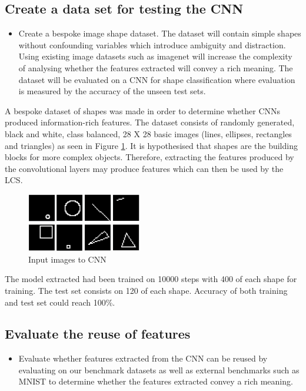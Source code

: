 \subsection{Create a data set for testing the CNN}
\begin{itemize}
	\item Create a bespoke image shape dataset. The dataset will contain simple shapes without confounding variables which introduce ambiguity and distraction. Using existing image datasets such as imagenet \cite{imagenet} will increase the complexity of analysing whether the features extracted will convey a rich meaning. The dataset will be evaluated on a CNN for shape classification where evaluation is measured by the accuracy of the unseen test sets.
	
\end{itemize}
A bespoke dataset of shapes was made in order to determine whether CNNs produced information-rich features. The dataset consists of randomly generated, black and white, class balanced, 28 X 28 basic images (lines, ellipses, rectangles and triangles) as seen in Figure \ref{fig:inputShapes}. It is hypothesised that shapes are the building blocks for more complex objects. Therefore, extracting the features produced by the convolutional layers may produce features which can then be used by the LCS. 
\begin{figure}[H]
	\begin{center}
		\includegraphics[width=50mm, scale=0.9]{inputShapes.png}
		\caption{Input images to CNN}
		\label{fig:inputShapes}
	\end{center}
	
\end{figure}
The model extracted had been trained on 10000 steps with 400 of each shape for training. The test set consists on 120 of each shape. Accuracy of both training and test set could reach 100\%. 

\subsection{Evaluate the reuse of features} \label{subsec:reuse}
\begin{itemize}
		\item Evaluate whether features extracted from the CNN can be reused by evaluating on our benchmark datasets as well as external benchmarks such as MNIST to determine whether the features extracted convey a rich meaning.
	
\end{itemize}

